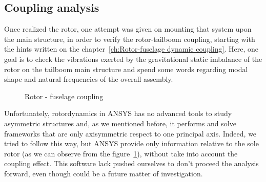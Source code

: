 \subsection*{Coupling analysis}
\noindent Once realized the rotor, one attempt was given on mounting that system upon the main structure, in order to verify the rotor-tailboom coupling, starting with the hints written on the chapter~\ref{ch:Rotor-fuselage dynamic coupling}. Here, one goal is to check the vibrations exerted by the gravitational static imbalance of the rotor on the tailboom main structure and spend some words regarding modal shape and natural frequencies of the overall assembly. 

\medskip
\begin{figure}[h]	
	\centering
	 \quad
	\caption{Rotor - fuselage coupling}
	\label{Rotor - fuselage coupling}
\end{figure}

\noindent
Unfortunately, rotordynamics in ANSYS has no advanced tools to study asymmetric structures and, as we mentioned before, it performs and solve frameworks that are only axisymmetric respect to one principal axis. Indeed, we tried to follow this way, but ANSYS provide only information relative to the sole rotor (as we can observe from the figure~\ref{Rotor - fuselage coupling}), without take into account the coupling effect. This software lack pushed ourselves to don't proceed the analysis forward, even though could be a future matter of investigation.

